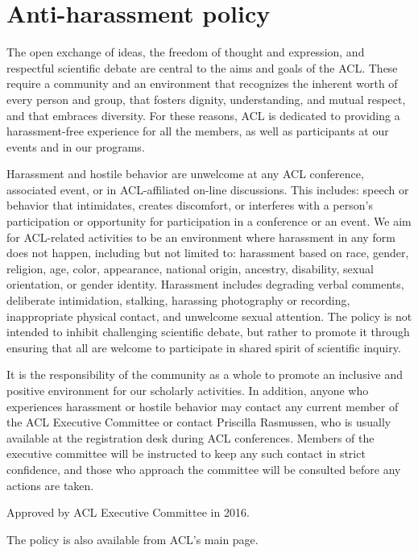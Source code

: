 \chapter[Anti-harassment policy]{Anti-harassment policy}
\thispagestyle{emptyheader}
\setheaders{}{}
The open exchange of ideas, the freedom of thought and expression, and respectful scientific debate are central to the aims and goals of the ACL. These require a community and an environment that recognizes the inherent worth of every person and group, that fosters dignity, understanding, and mutual respect, and that embraces diversity. For these reasons, ACL is dedicated to providing a harassment-free experience for all the members, as well as participants at our events and in our programs.

Harassment and hostile behavior are unwelcome at any ACL conference, associated event, or in ACL-affiliated on-line discussions. This includes: speech or behavior that intimidates, creates discomfort, or interferes with a person's participation or opportunity for participation in a conference or an event. We aim for ACL-related activities to be an environment where harassment in any form does not happen, including but not limited to: harassment based on race, gender, religion, age, color, appearance, national origin, ancestry, disability, sexual orientation, or gender identity. Harassment includes degrading verbal comments, deliberate intimidation, stalking, harassing photography or recording, inappropriate physical contact, and unwelcome sexual attention. The policy is not intended to inhibit challenging scientific debate, but rather to promote it through ensuring that all are welcome to participate in shared spirit of scientific inquiry.

It is the responsibility of the community as a whole to promote an inclusive and positive environment for our scholarly activities. In addition, anyone who experiences harassment or hostile behavior may contact any current member of the ACL Executive Committee or contact Priscilla Rasmussen, who is usually available at the registration desk during ACL conferences. Members of the executive committee will be instructed to keep any such contact in strict confidence, and those who approach the committee will be consulted before any actions are taken.

Approved by ACL Executive Committee in 2016.

The policy is also available from ACL's main page.

